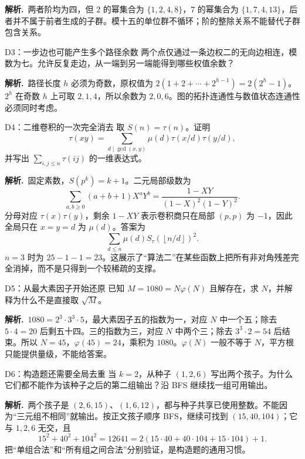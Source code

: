\documentclass[UTF8,a4paper,11pt,oneside,openany,fontset=fandol]{ctexbook}
\theoremstyle{definition}
\newcommand{\floor}[1]{\left\lfloor #1\right\rfloor}
\newcommand{\sol}{\par\noindent\textbf{解析.}\ }
\begin{document}
\sol 两者阶均为四，但 $2$ 的幂集合为 $\{1,2,4,8\}$，$7$ 的幂集合为 $\{1,7,4,13\}$，后者并不属于前者生成的子群。模十五的单位群不循环；阶的整除关系不能替代子群包含关系。


\begin{problem}{D3：一步边也可能产生多个路径余数}
两个点仅通过一条边权二的无向边相连，模数为七。允许反复走边，从一端到另一端能得到哪些权值余数？
\end{problem}

\sol 路径长度 $h$ 必须为奇数，原权值为 $2(1+2+\cdots+2^{h-1})=2(2^h-1)$。$2^h$ 在奇数 $h$ 上可取 $2,1,4$，所以余数为 $2,0,6$。图的拓扑连通性与数值状态连通性必须同时考虑。


\begin{problem}{D4：二维卷积的一次完全消去}
取 $S(n)=\tau(n)$。证明
\[
 \tau(xy)=\sum_{d\mid\gcd(x,y)}\mu(d)\tau(x/d)\tau(y/d),
\]
并写出 $\sum_{i,j\le n}\tau(ij)$ 的一维表达式。
\end{problem}

\sol 固定素数，$S(p^k)=k+1$。二元局部级数为
\[
 \sum_{a,b\ge0}(a+b+1)X^aY^b
 =\frac{1-XY}{(1-X)^2(1-Y)^2}.
\]
分母对应 $\tau(x)\tau(y)$，剩余 $1-XY$ 表示卷积商只在局部 $(p,p)$ 为 $-1$，因此全局只在 $x=y=d$ 为 $\mu(d)$。答案为
\[
 \sum_{d\le n}\mu(d)S_\tau(\floor{n/d})^2.
\]
$n=3$ 时为 $25-1-1=23$。这展示了“算法二”在某些函数上把所有非对角残差完全消掉，而不是只得到一个较稀疏的支撑。


\begin{problem}{D5：从最大素因子开始还原}
已知 $M=1080=N\varphi(N)$ 且解存在，求 $N$，并解释为什么不是直接取 $\sqrt M$。
\end{problem}

\sol $1080=2^3\cdot3^3\cdot5$，最大素因子五的指数为一，对应 $N$ 中一个五；除去 $5\cdot4=20$ 后剩五十四。三的指数为三，对应 $N$ 中两个三；除去 $3^3\cdot2=54$ 后结束。所以 $N=45$，$\varphi(45)=24$，乘积为 $1080$。$\varphi(N)$ 一般不等于 $N$，平方根只能提供量级，不能给答案。


\begin{problem}{D6：构造题还需要全局去重}
当 $k=2$，从种子 $(1,2,6)$ 写出两个孩子。为什么它们都不能作为该种子之后的第二组输出？沿 BFS 继续找一组可用输出。
\end{problem}

\sol 两个孩子是 $(2,6,15)$、$(1,6,12)$，都与种子共享已使用整数。不能因为“三元组不相同”就输出。按正文孩子顺序 BFS，继续可找到 $(15,40,104)$；它与 $1,2,6$ 无交，且
\[
15^2+40^2+104^2=12641=2(15\cdot40+40\cdot104+15\cdot104)+1.
\]
把“单组合法”和“所有组之间合法”分别验证，是构造题的通用习惯。
\end{document}
